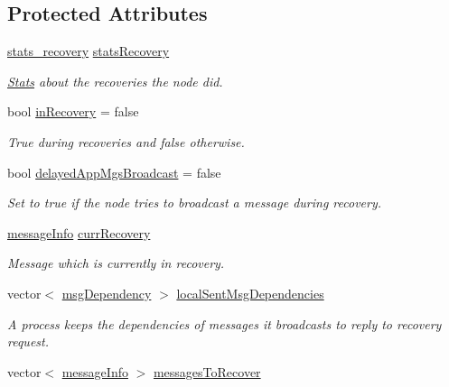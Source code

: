 \subsection*{Protected Attributes}
\begin{DoxyCompactItemize}
\item 
\hyperlink{_node_with_recovery_8h_a8724f9aa35500c4029d1757428ade746}{stats\+\_\+recovery} \hyperlink{class_node_with_recovery_abaecd0d1b36ad0305c281905a3465dd6}{stats\+Recovery}
\begin{DoxyCompactList}\small\item\em \hyperlink{class_stats}{Stats} about the recoveries the node did. \end{DoxyCompactList}\item 
bool \hyperlink{class_node_with_recovery_a4e8a29d0f69da296e9971bb5d8882cfb}{in\+Recovery} = false
\begin{DoxyCompactList}\small\item\em True during recoveries and false otherwise. \end{DoxyCompactList}\item 
bool \hyperlink{class_node_with_recovery_aae44e6b605047932d21cd5be25671963}{delayed\+App\+Mgs\+Broadcast} = false
\begin{DoxyCompactList}\small\item\em Set to true if the node tries to broadcast a message during recovery. \end{DoxyCompactList}\item 
\hyperlink{structures_8h_a7e7bdc1d2fff8a9436f2f352b2711ed6}{message\+Info} \hyperlink{class_node_with_recovery_a2e574321bd92cb51ef3346168057fe0f}{curr\+Recovery}
\begin{DoxyCompactList}\small\item\em Message which is currently in recovery. \end{DoxyCompactList}\item 
vector$<$ \hyperlink{_node_with_recovery_8h_a7a7c744666781dbc85c00bb4ccb4a60f}{msg\+Dependency} $>$ \hyperlink{class_node_with_recovery_a6b143ca2c401bbb2689443091d4d7e17}{local\+Sent\+Msg\+Dependencies}
\begin{DoxyCompactList}\small\item\em A process keeps the dependencies of messages it broadcasts to reply to recovery request. \end{DoxyCompactList}\item 
vector$<$ \hyperlink{structures_8h_a7e7bdc1d2fff8a9436f2f352b2711ed6}{message\+Info} $>$ \hyperlink{class_node_with_recovery_a9ed4ac06c68ac579d7848a98b145b5ae}{messages\+To\+Recover}

\end{DoxyCompactItemize}
